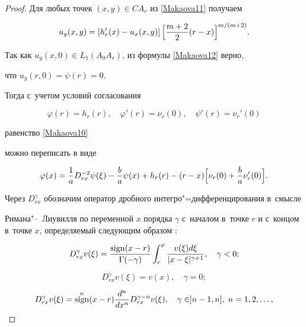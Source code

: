 \begin{proof}
Для любых точек $(x,y) \in  CA_r$ из \eqref{Makaova11} получаем 

\begin{equation}

\label{Makaova12}

u_y(x,y)=

\left[h_r'(x)-u_x(x,y)\right] \Bigl[\frac{m+2}{2}(r-x)\Bigr]^{{m}/({m+2})}.

\end{equation}

Так как $u_y(x,0) \in L_1(A_0A_r)$,  из формулы \eqref{Makaova12} верно, 

что ${u_y(r,0)=\psi(r)=0}$. 

Тогда с~учетом условий согласования

$$\varphi(r)=h_r(r),\quad \varphi'(r)=\nu_r(0), \quad \psi'(r)=\nu_r'(0)$$ 

равенство \eqref{Makaova10}

можно переписать в виде

\begin{equation}

\label{Makaova13} 

\varphi(x)= \frac{1}{a} D_{rx}^{-2} \psi(\xi)-\frac{b}{a} \psi(x)+

h_r(r)-(r-x)\Bigl[ \nu_r(0)+\frac{b}{a}\nu_r'(0)\Bigr].

\end{equation}







Через $D^\gamma_{rx}$  обозначим оператор дробного интегро"=дифференцирования в~смысле

Римана"--~Лиувилля по переменной  $x$ порядка $\gamma $ с~началом в~точке $r$ и с~концом в~точке $x$, определяемый следующим образом \cite{Nakhushev_16}:

\[

 D_{rx}^{\gamma}  v(\xi)=\frac{\mathop{\rm sign}(x-r)}{\Gamma(-\gamma)} \int _{r}^{x} 

 \frac{v(\xi) d \xi}{|x-\xi|^{\gamma+1}}, \quad   \gamma<0;

\]

\[

 D_{rx}^{\gamma}  v(\xi)=v(x), \quad   \gamma=0;

\]

\[

 D_{rx}^{\gamma}  v(\xi)=\mathop{\rm sign}^n(x-r) \frac{d^n}{dx^n} 

 D_{rx}^{\gamma-n}  v(\xi), \quad   \gamma \in ]n-1, n], \;  n=1, 2,\dots,

\]
\end{proof}
